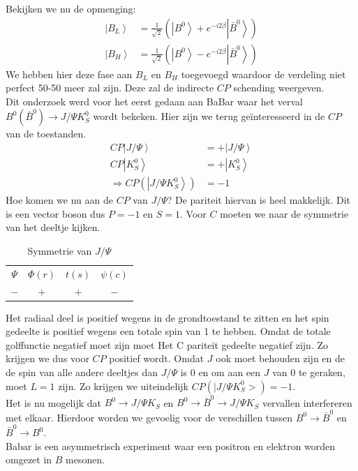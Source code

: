 \documentclass[../main.tex]{subfiles}
\begin{document}
Bekijken we nu de opmenging:
\begin{equation}
    \begin{aligned}
        \label{eq:b_opmenging}
        \left| B_{L}\right>&=\frac{1}{\sqrt{2}}\left(\left|B^{0}\right>+e^{-i 2 \beta}\left| \bar{B}^{0}\right>\right) \\
        \left| B_{H}\right>&=\frac{1}{\sqrt{2}}\left(\left|B^{0}\right>-e^{-i 2 \beta}\left| \bar{B}^{0}\right>\right)
    \end{aligned}
\end{equation}
We hebben hier deze fase aan $B_L$ en $B_H$ toegevoegd waardoor de verdeling niet perfect 50-50 meer zal zijn. Deze zal de indirecte $CP$ schending weergeven.\\
Dit onderzoek werd voor het eerst gedaan aan BaBar waar het verval $B^{0}\left(\bar{B}^{0}\right) \rightarrow J / \Psi K_{S}^{0}$ wordt bekeken. Hier zijn we terug geïnteresseerd in de $CP$ van de toestanden.
\begin{equation}
    \begin{aligned}
        \label{eq:cp_toestanden}
        C P\left|J / \Psi\right>&=+\left| J / \Psi\right>\\
        C P\left|K_{S}^{0}\right>&=+\left| K_{S}^{0}\right>\\
        \Rightarrow C P\left(\left| J / \Psi K_{S}^{0}\right>\right)&=-1
    \end{aligned}
\end{equation}
Hoe komen we nu aan de $CP$ van $J / \Psi$? De pariteit hiervan is heel makkelijk. Dit is een vector boson dus $P=-1$ en $S=1$. Voor $C$ moeten we naar de symmetrie van het deeltje kijken.

\begin{table}[h]
    \centering
    \caption{Symmetrie van $J / \Psi$}
    \label{tab:label}
    \begin{tabular}{cccc}
        $\Psi$ & $\Phi(r)$ & $t(s)$ & $\psi(c)$ \\
        $-$    & $+$       & $+$    & $-$
    \end{tabular}
\end{table}

Het radiaal deel is positief wegens in de grondtoestand te zitten en het spin gedeelte is positief wegens een totale spin van 1 te hebben. Omdat de totale golffunctie negatief moet zijn moet Het C pariteit gedeelte negatief zijn. Zo krijgen we dus voor $CP$ positief wordt. Omdat $J$ ook moet behouden zijn en de de spin van alle andere deeltjes dan $J / \Psi$ is 0 en om aan een $J$ van 0 te geraken, moet $L=1$ zijn. Zo krijgen we uiteindelijk $C P\left(\mid J / \Psi K_{S}^{0}>\right)=-1$.\\
Het is nu mogelijk dat $B^{0} \rightarrow J / \Psi K_{S}$ en $B^{0} \rightarrow \bar{B}^{0} \rightarrow J / \Psi K_{S}$ vervallen interfereren met elkaar. Hierdoor worden we gevoelig voor de verschillen tussen $B^{0} \rightarrow \bar{B}^{0}$ en $\bar{B}^{0} \rightarrow B^{0}$.\\
Babar is een asymmetrisch experiment waar een positron en elektron worden omgezet in $B$ mesonen.
\end{document}
